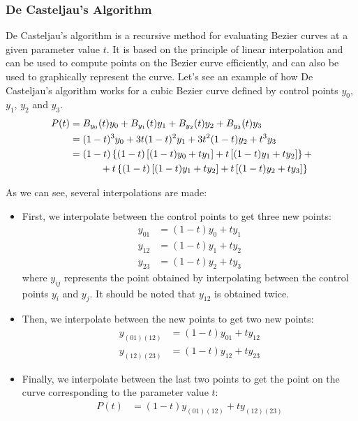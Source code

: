 \subsubsection{De Casteljau's Algorithm}

De Casteljau's algorithm is a recursive method for evaluating Bezier curves at a given parameter value $t$. It is based on the principle of linear interpolation and can be used to compute points on the Bezier curve efficiently, and can also be used to graphically represent the curve. Let's see an example of how De Casteljau's algorithm works for a cubic Bezier curve defined by control points $y_0$, $y_1$, $y_2$ and $y_3$.
\begin{align*}
    P(t) &= B_{y_0}(t) y_0 + B_{y_1}(t) y_1 + B_{y_2}(t) y_2 + B_{y_3}(t) y_3 \\
    &= (1 - t)^3 y_0 + 3t(1 - t)^2 y_1 + 3t^2(1 - t) y_2 + t^3 y_3
    \\&= (1 - t) \left\{ (1 - t)\left[ (1 - t) y_0 + t y_1 \right] + t \left[ (1 - t) y_1 + t y_2 \right] \right\} +\\&\hspace{1.1cm}+ t \left\{ (1 - t) \left[ (1 - t) y_1 + t y_2 \right] + t \left[ (1 - t) y_2 + t y_3 \right] \right\}
\end{align*}

As we can see, several interpolations are made:
\begin{itemize}
    \item First, we interpolate between the control points to get three new points:
    \begin{align*}
        y_{01} &= (1 - t) y_0 + t y_1 \\
        y_{12} &= (1 - t) y_1 + t y_2 \\
        y_{23} &= (1 - t) y_2 + t y_3
    \end{align*}
    where $y_{ij}$ represents the point obtained by interpolating between the control points $y_i$ and $y_j$. It should be noted that $y_{12}$ is obtained twice.
    \item Then, we interpolate between the new points to get two new points:
    \begin{align*}
        y_{(01)(12)} &= (1 - t) y_{01} + t y_{12} \\
        y_{(12)(23)} &= (1 - t) y_{12} + t y_{23}
    \end{align*}
    \item Finally, we interpolate between the last two points to get the point on the curve corresponding to the parameter value $t$:
    \begin{align*}
        P(t) &= (1 - t) y_{(01)(12)} + t y_{(12)(23)}
    \end{align*}
\end{itemize}

